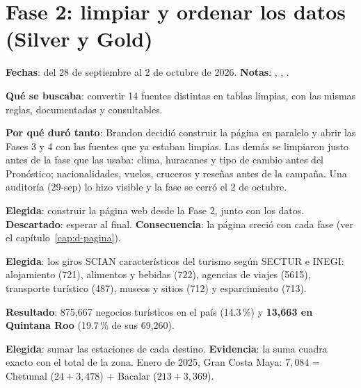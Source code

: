 \chapter{Fase 2: limpiar y ordenar los datos (Silver y Gold)}
\label{cap:d-f2}
\textbf{Fechas}: del 28 de septiembre al 2 de octubre de 2026. \textbf{Notas}: ,
, .

\textbf{Qué se buscaba}: convertir 14 fuentes distintas en tablas limpias, con las mismas reglas, documentadas y
consultables.

\textbf{Por qué duró tanto}: Brandon decidió construir la página en paralelo y abrir las Fases 3 y 4 con las fuentes que ya
estaban limpias. Las demás se limpiaron justo antes de la fase que las usaba: clima, huracanes y tipo de cambio antes del
Pronóstico; nacionalidades, vuelos, cruceros y reseñas antes de la campaña. Una auditoría (29-sep) lo hizo visible y la fase
se cerró el 2 de octubre.

\begin{opciones}
\textbf{Elegida}: construir la página web desde la Fase 2, junto con los datos. \textbf{Descartado}: esperar al final.
\textbf{Consecuencia}: la página creció con cada fase (ver el capítulo~\ref{cap:d-pagina}).
\end{opciones}

\begin{opciones}
\textbf{Elegida}: los giros SCIAN característicos del turismo según SECTUR e INEGI: alojamiento (721), alimentos y bebidas
(722), agencias de viajes (5615), transporte turístico (487), museos y sitios (712) y esparcimiento (713).

\textbf{Resultado}: 875,667 negocios turísticos en el país (14.3\,\%) y \textbf{13,663 en Quintana Roo} (19.7\,\% de sus
69,260).
\end{opciones}

\begin{opciones}
\textbf{Elegida}: sumar las estaciones de cada destino. \textbf{Evidencia}: la suma cuadra exacto con el total de la zona.
Enero de 2025, Gran Costa Maya: $7{,}084$ = Chetumal ($24+3{,}478$) + Bacalar ($213+3{,}369$).
\end{opciones}

